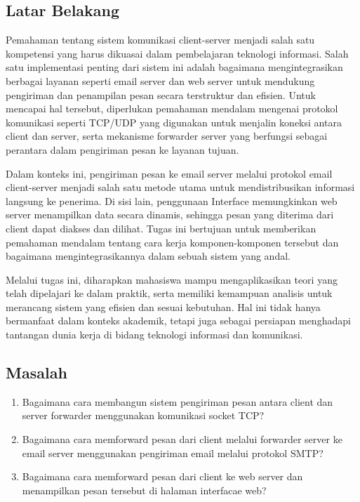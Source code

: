\documentclass[12pt, a4paper]{article}
\begin{document}
\subsection{Latar Belakang}
\begin{adjustwidth}{1.4cm}{0cm}
\quad\quad Pemahaman tentang sistem komunikasi client-server menjadi salah satu kompetensi yang harus dikuasai dalam pembelajaran teknologi informasi. Salah satu implementasi penting dari sistem ini adalah bagaimana mengintegrasikan berbagai layanan seperti email server dan web server untuk mendukung pengiriman dan penampilan pesan secara terstruktur dan efisien. Untuk mencapai hal tersebut, diperlukan pemahaman mendalam mengenai protokol komunikasi seperti TCP/UDP yang digunakan untuk menjalin koneksi antara client dan server, serta mekanisme forwarder server yang berfungsi sebagai perantara dalam pengiriman pesan ke layanan tujuan.

Dalam konteks ini, pengiriman pesan ke email server melalui protokol email client-server menjadi salah satu metode utama untuk mendistribusikan informasi langsung ke penerima. Di sisi lain, penggunaan Interface memungkinkan web server menampilkan data secara dinamis, sehingga pesan yang diterima dari client dapat diakses dan dilihat. Tugas ini bertujuan untuk memberikan pemahaman mendalam tentang cara kerja komponen-komponen tersebut dan bagaimana mengintegrasikannya dalam sebuah sistem yang andal.

Melalui tugas ini, diharapkan mahasiswa mampu mengaplikasikan teori yang telah dipelajari ke dalam praktik, serta memiliki kemampuan analisis untuk merancang sistem yang efisien dan sesuai kebutuhan. Hal ini tidak hanya bermanfaat dalam konteks akademik, tetapi juga sebagai persiapan menghadapi tantangan dunia kerja di bidang teknologi informasi dan komunikasi.
\end{adjustwidth}

\subsection{Masalah}
\setlength{\leftmargini}{1.75cm}
\begin{enumerate}
\item Bagaimana cara membangun sistem pengiriman pesan antara client dan server forwarder menggunakan komunikasi socket TCP?
\item Bagaimana cara memforward pesan dari client melalui forwarder server ke email server menggunakan pengiriman email melalui protokol SMTP?
\item Bagaimana cara memforward pesan dari client ke web server dan menampilkan pesan tersebut di halaman interfacae web?
\end{enumerate}
\end{document}
